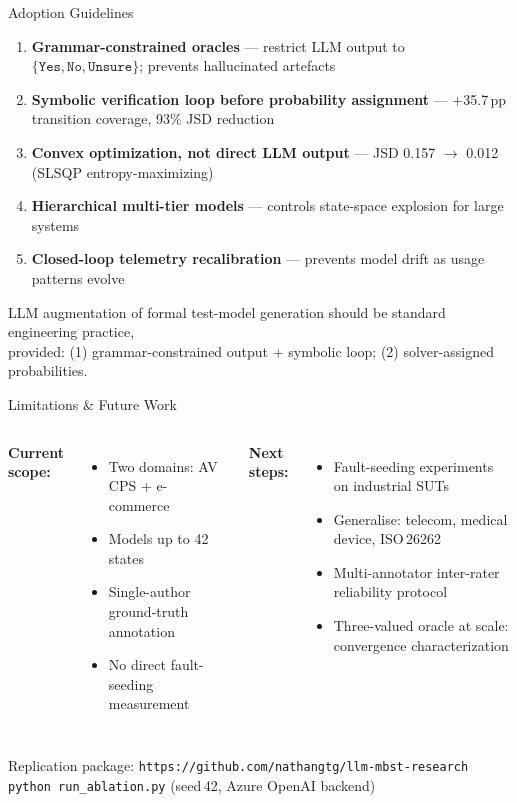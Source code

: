 \documentclass[aspectratio=169,10pt]{beamer}
\newcommand{\pos}[1]{\textcolor{positive}{#1}}
\newcommand{\con}[1]{\textcolor{negative}{#1}}
\newcommand{\HL}[1]{\textcolor{emphasis}{#1}}
\begin{document}
\begin{frame}{Adoption Guidelines}
  \begin{enumerate}
    \item \textbf{Grammar-constrained oracles} — restrict LLM output to $\{\texttt{Yes},\texttt{No},\texttt{Unsure}\}$; prevents hallucinated artefacts
    \item \textbf{Symbolic verification loop before probability assignment} — +35.7\,pp transition coverage, 93\% JSD reduction
    \item \textbf{Convex optimization, not direct LLM output} — JSD 0.157 $\to$ 0.012 (SLSQP entropy-maximizing)
    \item \textbf{Hierarchical multi-tier models} — controls state-space explosion for large systems
    \item \textbf{Closed-loop telemetry recalibration} — prevents model drift as usage patterns evolve
  \end{enumerate}
  \vspace{0.4em}
  \begin{center}
    \HL{LLM augmentation of formal test-model generation should be standard engineering practice,}\\
    \small provided: (1) grammar-constrained output + symbolic loop; (2) solver-assigned probabilities.
  \end{center}
\end{frame}

\begin{frame}{Limitations \& Future Work}
  \begin{columns}[T]
      \textbf{\con{Current scope:}}
      \begin{itemize}
        \item Two domains: AV CPS + e-commerce
        \item Models up to 42 states
        \item Single-author ground-truth annotation
        \item No direct fault-seeding measurement
      \end{itemize}
      \textbf{\pos{Next steps:}}
      \begin{itemize}
        \item Fault-seeding experiments on industrial SUTs
        \item Generalise: telecom, medical device, ISO\,26262
        \item Multi-annotator inter-rater reliability protocol
        \item Three-valued oracle at scale: convergence characterization
      \end{itemize}
  \end{columns}
  \vspace{0.4em}
  \begin{center}
    \small Replication package: \texttt{https://github.com/nathangtg/llm-mbst-research}\\
    \texttt{python run\_ablation.py} (seed\,42, Azure OpenAI backend)
  \end{center}
\end{frame}
\end{document}
